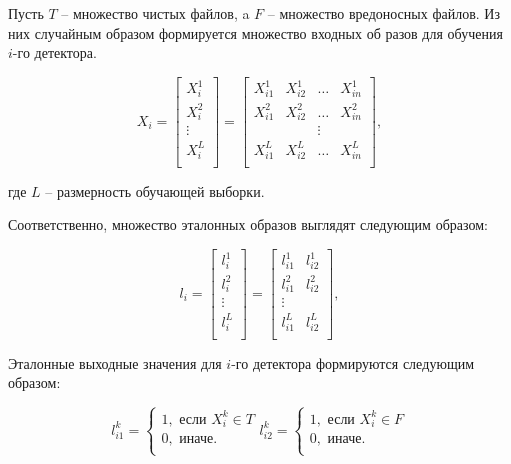 \documentclass[bachelor, och, referat]{template}
\begin{document}
Пусть $T$ -- множество чистых файлов, a $F$ -- множество вредоносных
файлов. Из них случайным образом формируется множество входных об­
разов для обучения $i$-го детектора.

\begin{equation}
    X_i =
    \begin{bmatrix}
        X_i^1 \\
        X_i^2 \\
        \vdots \\
        X_i^L \\
    \end{bmatrix}
    =
    \begin{bmatrix}
        X_{i1}^1 & X_{i2}^1 & \dots & X_{in}^1 \\
        X_{i1}^2 & X_{i2}^2 & \dots & X_{in}^2 \\
        && \vdots & \\
        X_{i1}^L & X_{i2}^L & \dots & X_{in}^L \\    
    \end{bmatrix},
    \label{eq2}
\end{equation}

где $L$ -- размерность обучающей выборки.

Соответственно, множество эталонных образов выглядят следующим
образом:

\begin{equation}
    l_i =
    \begin{bmatrix}
        l_i^1 \\
        l_i^2 \\
        \vdots \\
        l_i^L \\
    \end{bmatrix}
    =
    \begin{bmatrix}
        l_{i1}^1 & l_{i2}^1 \\
        l_{i1}^2 & l_{i2}^2 \\
        \vdots \\
        l_{i1}^L & l_{i2}^L \\    
    \end{bmatrix},
    \label{eq3}
\end{equation}


Эталонные выходные значения для $i$-го детектора формируются сле­дующим образом:

\begin{equation}
    l_{i1}^k = 
    \begin{cases}
        1, \text{ если } X_i^k \in T \\
        0, \text{ иначе.} \\
    \end{cases}
    l_{i2}^k = 
    \begin{cases}
        1, \text{ если } X_i^k \in F \\
        0, \text{ иначе.} \\
    \end{cases}
    \label{eq4}
\end{equation}
\end{document}
